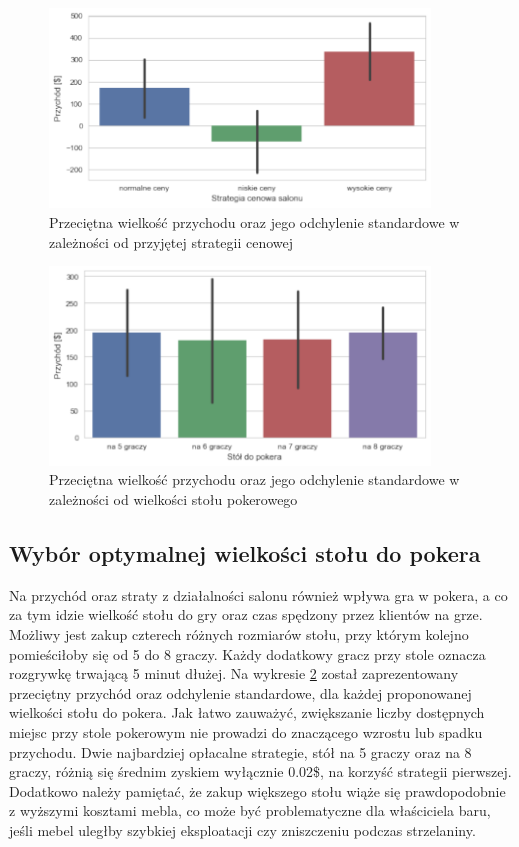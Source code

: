 \documentclass[12pt, a4paper, oneside]{mwart} %
\begin{document}
\begin{figure}
\centering
\caption{Przeciętna wielkość przychodu oraz jego odchylenie standardowe w zależności od przyjętej strategii cenowej}
\label{wyk_drinki}
\includegraphics[width = 0.9\textwidth]{wykresy/drinki.pdf}
\end{figure}

\begin{figure}
\centering
\caption{Przeciętna wielkość przychodu oraz jego odchylenie standardowe w zależności od wielkości stołu pokerowego}
\label{wyk_poker}
\includegraphics[width = 0.9\textwidth]{wykresy/poker.pdf}
\end{figure}

\subsection{Wybór optymalnej wielkości stołu do pokera}
Na przychód oraz straty z działalności salonu również wpływa gra w pokera, a co za tym idzie wielkość stołu do gry oraz czas spędzony przez klientów na grze. Możliwy jest zakup czterech różnych rozmiarów stołu, przy którym kolejno pomieściłoby się od 5 do 8 graczy. Każdy dodatkowy gracz przy stole oznacza rozgrywkę trwającą 5 minut dłużej. Na wykresie \ref{wyk_poker} został zaprezentowany przeciętny przychód oraz odchylenie standardowe, dla każdej proponowanej wielkości stołu do pokera. Jak łatwo zauważyć, zwiększanie liczby dostępnych miejsc przy stole pokerowym nie prowadzi do znaczącego wzrostu lub spadku przychodu. Dwie najbardziej opłacalne strategie, stół na 5 graczy oraz na 8 graczy, różnią się średnim zyskiem wyłącznie 0.02\$, na korzyść strategii pierwszej. Dodatkowo należy pamiętać, że zakup większego stołu wiąże się prawdopodobnie z wyższymi kosztami mebla, co może być problematyczne dla właściciela baru, jeśli mebel uległby szybkiej eksploatacji czy zniszczeniu podczas strzelaniny.
\end{document}
